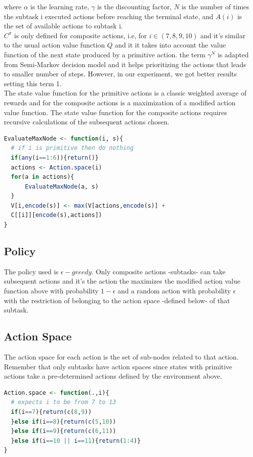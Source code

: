 \documentclass[twoside,twocolumn]{article}
\begin{document}
where $\alpha$ is the learning rate, $\gamma$ is the discounting factor, $N$ is the number of times the subtask i  executed actions before reaching the terminal state, and $A(i)$ is the set of available actions to  subtask i. \\
$C^\pi$ is only defined for composite actions, i.e, for $i\in (7,8,9,10)$ and it's similar to the usual action value function $Q$ and it it takes into account the value function of the next state produced by a primitive action. the term $\gamma^N$ is adapted from Semi-Markov decision model and it helps prioritizing the actions that leads to smaller number of steps. However, in our experiment, we got better results setting this term 1.\\
The state value function for the primitive actions is a classic weighted average of rewards and for the composite actions is a maximization of a modified action value function.
The state value function for the composite actions requires recursive calculations of the subsequent actions chosen. 
\begin{lstlisting}[language=R]
EvaluateMaxNode <- function(i, s){
  # if i is primitive then do nothing
  if(any(i==1:6)){return()}
  actions <- Action.space(i)
  for(a in actions){ 
	  EvaluateMaxNode(a, s)
  }
  V[i,encode(s)] <- max(V[actions,encode(s)] + 
  C[[i]][encode(s),actions])
}
\end{lstlisting}

\subsection*{Policy}

The policy used is $\epsilon-greedy$. Only composite actions -subtasks- can take subsequent actions and it's the action the maximizes the modified action value function above with probability $1-\epsilon$ and a random action with probability $\epsilon$ with the restriction of belonging to the action space -defined below- of that subtask. 


\subsection*{Action Space}
The action space for each action is the set of sub-nodes related to that action. Remember that only subtasks have action spaces since states with primitive actions take a pre-determined actions defined by the environment above.
\begin{lstlisting}[language=R]
Action.space <- function(.,i){
  # expects i to be from 7 to 13
  if(i==7){return(c(8,9))
  }else if(i==8){return(c(5,10))
  }else if(i==9){return(c(6,11))
  }else if(i==10 || i==11){return(1:4)}
}
\end{lstlisting}
\end{document}
